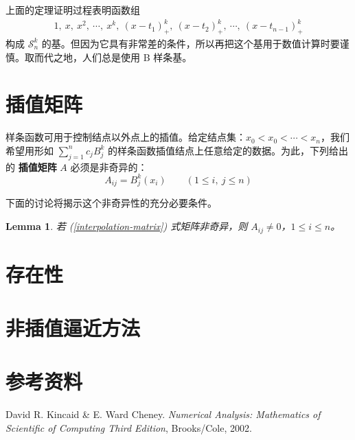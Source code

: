 \documentclass[a4paper]{article}
\newtheorem{lemma}{Lemma}
\begin{document}
    上面的定理证明过程表明函数组
    \begin{gather*}
        1,\ x,\ x^2,\ \cdots,\ x^k,\ (x - t_1)_+^k,\ (x - t_2)_+^k,\ \cdots,\ (x - t_{n-1})_+^k
    \end{gather*}
    构成 $\mathcal{S}_n^k$ 的基。但因为它具有非常差的条件，所以再把这个基用于数值计算时要谨慎。取而代之地，人们总是使用 B 样条基。


\section{插值矩阵}

    样条函数可用于控制结点以外点上的插值。给定结点集：$x_0 < x_0 < \cdots < x_n$，我们希望用形如 $\displaystyle\sum_{j = 1}^{n} c_j B_j^k$ 的样条函数插值结点上任意给定的数据。为此，下列给出的 {\bf 插值矩阵} $A$ 必须是非奇异的：
    \begin{equation}
    \label{interpolation-matrix}
        A_{ij} = B_{j}^{k}(x_{i}) \qquad (1 \leqslant i,\ j \leqslant n)
    \end{equation}

    下面的讨论将揭示这个非奇异性的充分必要条件。
\begin{lemma}
    若 (\ref{interpolation-matrix}) 式矩阵非奇异，则 $A_{ij} \neq 0$，$1 \leqslant i \leqslant n$。
\end{lemma}
\section{存在性}

\section{非插值逼近方法}
    

\section{参考资料}
	\noindent [1] David R. Kincaid \& E. Ward Cheney. {\it Numerical Analysis: Mathematics of Scientific of Computing Third Edition}, Brooks/Cole, 2002.
	
\end{document}
